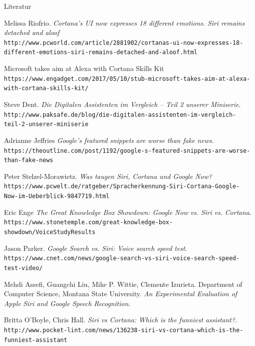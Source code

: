 \documentclass[18pt]{beamer}
\begin{document}
\begin{frame}[allowframebreaks]{Literatur}
\begin{thebibliography}{9}
		Melissa Riofrio.
		\textit{Cortana's UI now expresses 18 different emotions. Siri remains detached and aloof}
		\\\texttt{http://www.pcworld.com/article/2881902/cortanas-ui-now-expresses-18-different-emotions-siri-remains-detached-and-aloof.html}
		
		Microsoft takes aim at Alexa with Cortana Skills Kit
		\\\texttt{https://www.engadget.com/2017/05/10/stub-microsoft-takes-aim-at-alexa-with-cortana-skills-kit/}
		
		Steve Dent.
		\textit{Die Digitalen Assistenten im Vergleich – Teil 2 unserer Miniserie}.
		\\\texttt{http://www.paksafe.de/blog/die-digitalen-assistenten-im-vergleich-teil-2-unserer-miniserie}
		
		Adrianne Jeffries
		\textit{Google’s featured snippets are worse than fake news}.
		\\\texttt{https://theoutline.com/post/1192/google-s-featured-snippets-are-worse-than-fake-news}
		
		Peter Stelzel-Morawietz.
		\textit{Was taugen Siri, Cortana und Google Now?}
		\\\texttt{https://www.pcwelt.de/ratgeber/Spracherkennung-Siri-Cortana-Google-Now-im-Ueberblick-9847719.html}
		
		Eric Enge
		\textit{The Great Knowledge Box Showdown: Google Now vs. Siri vs. Cortana}.
		\\\texttt{https://www.stonetemple.com/great-knowledge-box-showdown/VoiceStudyResults}
		
		Jason Parker.
		\textit{Google Search vs. Siri: Voice search speed test}.
		\\\texttt{https://www.cnet.com/news/google-search-vs-siri-voice-search-speed-test-video/}
		
		Mehdi Assefi, Guangchi Liu, Mike P. Wittie, Clemente Izurieta. 
		Department of Computer Science, Montana State University.
		\textit{An Experimental Evaluation of Apple Siri and Google Speech Recognition}.
		
		Britta O'Boyle, Chris Hall.
		\textit{Siri vs Cortana: Which is the funniest assistant?}.
		\\\texttt{http://www.pocket-lint.com/news/136238-siri-vs-cortana-which-is-the-funniest-assistant} 
		
	\end{thebibliography}
\end{frame}
\end{document}
